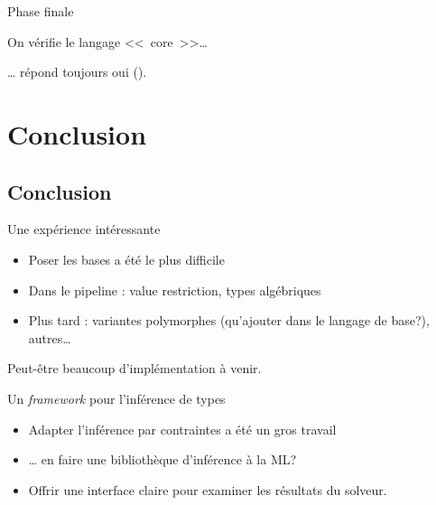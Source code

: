 \documentclass[final]{beamer}
\begin{document}
\begin{frame}{Phase finale}
  \begin{center}
On vérifie le langage <<~core~>>…

\vspace{5ex}

… répond toujours oui ().
  \end{center}
\end{frame}

\section{Conclusion}

\subsection{Conclusion}

\begin{frame}{Une expérience intéressante}
  \begin{itemize}
    \item Poser les bases a été le plus difficile
    \item Dans le pipeline : value restriction, types algébriques
    \item Plus tard : variantes polymorphes (qu'ajouter dans le langage de
      base?), autres…
  \end{itemize}

  Peut-être beaucoup d'implémentation à venir.
\end{frame}

\begin{frame}{Un \emph{framework} pour l'inférence de types}
  \begin{itemize}
    \item Adapter l'inférence par contraintes a été un gros travail
    \item … en faire une bibliothèque d'inférence à la ML?
    \item Offrir une interface claire pour examiner les résultats du solveur. 
  \end{itemize}
\end{frame}


{{%
}}
\end{document}

